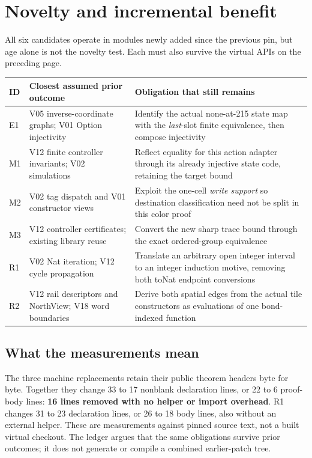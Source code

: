 \section{Novelty and incremental benefit}

All six candidates operate in modules newly added since the previous pin, but age alone is not the novelty test. Each must also survive the virtual APIs on the preceding page.

\begin{tabularx}{\linewidth}{@{}L{0.34in}L{1.72in}Y@{}}
\toprule
ID & Closest assumed prior outcome & Obligation that still remains \\
\midrule
E1 & V05 inverse-coordinate graphs; V01 Option injectivity & Identify the actual none-at-215 state map with the \emph{last}-slot finite equivalence, then compose injectivity \\
M1 & V12 finite controller invariants; V02 simulations & Reflect equality for this action adapter through its already injective state code, retaining the target bound \\
M2 & V02 tag dispatch and V01 constructor views & Exploit the one-cell \emph{write support} so destination classification need not be split in this color proof \\
M3 & V12 controller certificates; existing library reuse & Convert the new sharp trace bound through the exact ordered-group  equivalence \\
R1 & V02 Nat iteration; V12 cycle propagation & Translate an arbitrary open integer interval to an integer induction motive, removing both toNat endpoint conversions \\
R2 & V12 rail descriptors and NorthView; V18 word boundaries & Derive both spatial edges from the actual tile constructors as evaluations of one bond-indexed function \\
\bottomrule
\end{tabularx}

\subsection{What the measurements mean}

The three machine replacements retain their public theorem headers byte for byte. Together they change 33 to 17 nonblank declaration lines, or 22 to 6 proof-body lines: \textbf{16 lines removed with no helper or import overhead}. R1 changes 31 to 23 declaration lines, or 26 to 18 body lines, also without an external helper. These are measurements against pinned source text, not a built virtual checkout. The ledger argues that the same obligations survive prior outcomes; it does not generate or compile a combined earlier-patch tree.

